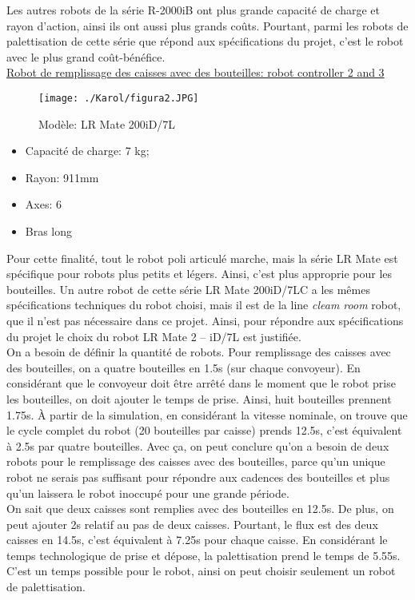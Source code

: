 Les autres robots de la série R-2000iB ont plus grande capacité de charge et rayon d’action, ainsi ils ont aussi plus grands coûts. Pourtant, parmi les robots de palettisation de cette série que répond aux spécifications du projet, c’est le robot avec le plus grand coût-bénéfice. \\

\underline{Robot de remplissage des caisses avec des bouteilles: robot controller 2 and 3 }\\


\begin{figure}[H]
	\begin{center}	
		\texttt{[image: ./Karol/figura2.JPG]}
		\caption{Modèle: LR Mate 200iD/7L}
		\label{fig:LR_Mate_200iD/7L}
	\end{center}
\end{figure}
\newpage
\begin{itemize}
	\item Capacité de charge: 7 kg;
	\item Rayon: 911mm
	\item Axes: 6
	\item Bras long
\end{itemize}

\vspace{20pt}
Pour cette finalité, tout le robot poli articulé marche, mais la série LR Mate est spécifique pour robots plus petits et légers. Ainsi, c’est plus approprie pour les bouteilles. Un autre robot de cette série LR Mate 200iD/7LC a les mêmes spécifications techniques du robot choisi, mais il est de la line \textit{cleam room} robot, que il n’est pas nécessaire dans ce projet. Ainsi, pour répondre aux spécifications du projet le choix du robot LR Mate 2 – iD/7L est justifiée. \\
On a besoin de définir la quantité de robots. Pour remplissage des caisses avec des bouteilles, on a quatre bouteilles en 1.5s (sur chaque convoyeur). En considérant que le convoyeur doit être arrêté dans le moment que le robot prise les bouteilles, on doit ajouter le temps de prise. Ainsi, huit bouteilles prennent 1.75s. À partir de la simulation, en considérant la vitesse nominale, on trouve que le cycle complet du robot (20 bouteilles par caisse) prends 12.5s, c’est équivalent à 2.5s par quatre bouteilles. Avec ça, on peut conclure qu’on a besoin de deux robots pour le remplissage des caisses avec des bouteilles, parce qu’un unique robot ne serais pas suffisant pour répondre aux cadences des bouteilles et plus qu’un laissera le robot inoccupé pour une grande période. \\
On sait que deux caisses sont remplies avec des bouteilles en 12.5s. De plus, on peut ajouter 2s relatif au pas de deux caisses. Pourtant, le flux est des deux caisses en 14.5s, c’est équivalent à 7.25s pour chaque caisse. En considérant le temps technologique de prise et dépose, la palettisation prend le temps de 5.55s. C’est un temps possible pour le robot, ainsi on peut choisir seulement un robot de palettisation. 
 
